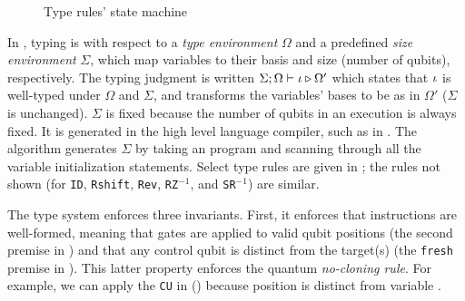 \begin{figure}[t]
\begin{minipage}[t]{0.35\textwidth}
{\begin{center}
\end{center}
}
\caption{Type rules' state machine}
\label{fig:state-machine}
\end{minipage}
\end{figure}

\label{sec:vqir-typing}

In \oqasm, typing is with respect to a \emph{type environment}
$\Omega$ and a predefined \emph{size
  environment} $\Sigma$, which map \oqasm
variables to their basis and size (number of qubits), respectively.
The typing judgment is written $\Sigma; \Omega\vdash \iota \triangleright \Omega'$ which
states that $\iota$ is well-typed under $\Omega$ and $\Sigma$, and
transforms the variables' bases to be as in $\Omega'$ ($\Sigma$ is unchanged). 
$\Sigma$ is fixed because the number of qubits in an execution is always fixed.
It is generated in the high level language compiler, such as \sourcelang in .
The algorithm generates $\Sigma$ by taking an \sourcelang program and scanning through
all the variable initialization statements.
Select type rules are given in ; 
the rules not shown (for \texttt{ID}, \texttt{Rshift}, \texttt{Rev}, \texttt{RZ}$^{-1}$, and \texttt{SR}$^{-1}$) are similar.

The type system enforces three invariants.  First, it enforces that
instructions are well-formed, meaning that gates are applied to valid
qubit positions (the second premise in ) and that any control qubit is distinct from the
target(s) (the \texttt{fresh} premise in
).  This latter property enforces the quantum
\emph{no-cloning rule}.
For example, we can apply the \texttt{CU} in  ()
because position  is distinct from variable .

